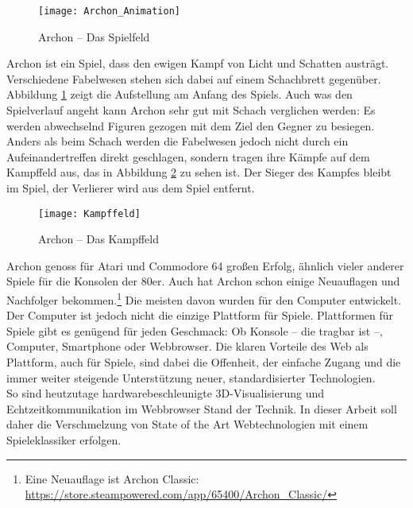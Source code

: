 \clearpage
\begin{figure}[htp]
	\centering
	\captionsetup{justification=centering}
	\texttt{[image: Archon\_Animation]}
	\caption[Archon-Spielfeld]{Archon -- Das Spielfeld\footnotemark}
	\label{fig:Archon_Feld}
\end{figure}
\noindent Archon ist ein Spiel, dass den ewigen Kampf von Licht und Schatten austrägt. Verschiedene Fabelwesen stehen sich dabei auf einem Schachbrett gegenüber. Abbildung \ref{fig:Archon_Feld} zeigt die Aufstellung am Anfang des Spiels. Auch was den Spielverlauf angeht kann Archon sehr gut mit Schach verglichen werden: Es werden abwechselnd Figuren gezogen mit dem Ziel den Gegner zu besiegen. Anders als beim Schach werden die Fabelwesen jedoch nicht durch ein Aufeinandertreffen direkt geschlagen, sondern tragen ihre Kämpfe auf dem Kampffeld aus, das in Abbildung \ref{fig:Archon_Kampffeld} zu sehen ist. Der Sieger des Kampfes bleibt im Spiel, der Verlierer wird aus dem Spiel entfernt.
\begin{figure}[htp]
	\centering
	\captionsetup{justification=centering}
	\texttt{[image: Kampffeld]}
	\caption[Archon-Kampffeld]{Archon -- Das Kampffeld\footnotemark}
	\label{fig:Archon_Kampffeld}
\end{figure}

\noindent Archon genoss für Atari und Commodore 64 großen Erfolg, ähnlich vieler anderer Spiele für die Konsolen der 80er. Auch hat Archon schon einige Neuauflagen und Nachfolger bekommen.\footnote{Eine Neuauflage ist Archon Classic: \url{https://store.steampowered.com/app/65400/Archon_Classic/}}
Die meisten davon wurden für den Computer entwickelt. Der Computer ist jedoch nicht die einzige Plattform für Spiele.
Plattformen für Spiele gibt es genügend für jeden Geschmack: Ob Konsole -- die \ggf tragbar ist --, Computer, Smartphone oder Webbrowser.
Die klaren Vorteile des Web als Plattform, auch für Spiele, sind dabei die Offenheit, der einfache Zugang und die immer weiter steigende Unterstützung neuer, standardisierter Technologien.\\
So sind heutzutage hardwarebeschleunigte\footnotemark{} 3D-Visualisierung und Echtzeitkommunikation im Webbrowser Stand der Technik.
In dieser Arbeit soll daher die Verschmelzung von State of the Art Webtechnologien mit einem Spieleklassiker erfolgen.\\

